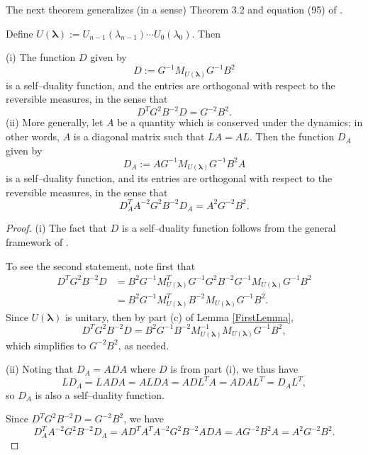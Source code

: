 \documentclass{ximera}
\begin{document}
The next theorem generalizes (in a sense) Theorem 3.2 and equation (95) of \cite{CFG21}.
\begin{theorem}\label{AlgThm}
Define $U(\boldsymbol\lambda):=U_{n-1}(\lambda_{n-1})\cdots U_0(\lambda_0)$. Then

(i)
The function $D$ given by 
$$
D:= G^{-1} M_{U(\boldsymbol\lambda)} G^{-1}B^2
$$
is a self--duality function, and the entries are orthogonal with respect to the reversible measures, in the sense that
$$
D^T G^2 B^{-2}D = G^{-2}B^2.
$$
(ii) More generally, let $A$ be a quantity which is conserved under the dynamics; in other words, $A$ is a diagonal matrix such that $LA=AL$. Then the function $D_A$ given by 
$$
D_A := AG^{-1}M_{U(\boldsymbol\lambda)}G^{-1}B^2A
$$
is a self--duality function, and its entries are orthogonal with respect to the reversible measures, in the sense that
$$
D_A^T A^{-2}G^2B^{-2} D_A = A^2G^{-2}B^2.
$$
\end{theorem}
\begin{proof}
(i)
The fact that $D$ is a self--duality function follows from the general framework of \cite{Kuan-IMRN}.

To see the second statement, note first that 
\begin{align*}
D^T G^2 B^{-2}D &= B^2 G^{-1} M_{U(\boldsymbol\lambda)}^T G^{-1} G^2 B^{-2}G^{-1}M_{U(\boldsymbol\lambda)}G^{-1}B^2\\
&= B^2 G^{-1} M_{U(\boldsymbol\lambda)}^T B^{-2} M_{U(\boldsymbol\lambda)}G^{-1}B^2.
\end{align*}
Since $U(\boldsymbol\lambda)$ is unitary, then by part (c) of Lemma \ref{FirstLemma},
$$
D^T G^2 B^{-2}D =  B^2 G^{-1} B^{-2} M_{U(\boldsymbol\lambda)}^{-1}M_{U(\boldsymbol\lambda)} G^{-1}B^2,
$$
which simplifies to $G^{-2}B^2$, as needed. 

(ii) Noting that $D_A=ADA$ where $D$ is from part (i), we thus have
$$
LD_A = LADA = ALDA = ADL^TA = ADA L^T = D_AL^T,
$$
so $D_A$ is also a self--duality function.

Since $D^TG^2B^{-2}D = G^{-2}B^2$, we have
$$
D_A^T A^{-2}G^2B^{-2} D_A = AD^TA^T A^{-2}G^2B^{-2} ADA = AG^{-2}B^2A = A^2G^{-2}B^2.
$$
\end{proof}
\end{document}
